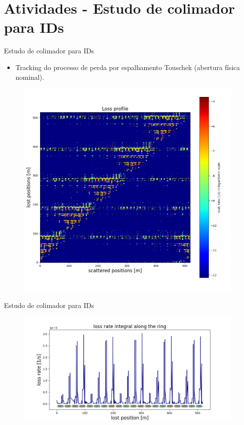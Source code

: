 \documentclass{beamer}					  %
\begin{document}
\section{Atividades - Estudo de colimador para IDs}

\begin{frame}{Estudo de colimador para IDs}
\begin{itemize}
        \item Tracking do processo de perda por espalhamento Touschek (abertura física nominal).
	\end{itemize}
\begin{figure}[H]
		\centering
        \includegraphics[width=.75\textwidth]{2023-10-27/figures/scat_vc_lost.png}
        \label{fig:scat_loss}
    \end{figure}
\end{frame}

\begin{frame}{Estudo de colimador para IDs}
    \begin{figure}[H]
    		\centering
            \includegraphics[width=.9\textwidth]{2023-10-27/figures/lossrate_vs_lostpos.png}
            \label{fig:scat_loss}
    \end{figure}
\end{frame}
\end{document}
